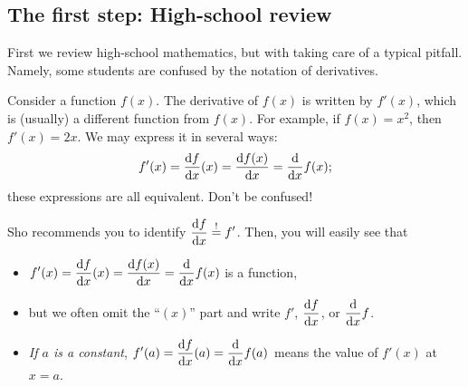\documentclass[11pt,pdfa,lastpage]{MishoNote}
\begin{document}
\begin{maketitle}
\OutputNote

\enlargethispage{-5em}

\makeatletter
{}
\makeatother

\end{maketitle}
\newpage
\subsection{The first step: High-school review}
First we review high-school mathematics, but with taking care of a typical pitfall.
Namely, some students are confused by the notation of derivatives.

Consider a function $f(x)$. The derivative of $f(x)$ is written by $f'(x)$, which is (usually) a different function from $f(x)$. For example, if $f(x)=x^2$, then $f'(x)=2x$.
We may express it in several ways:
\[ f'(x) = \diff{f}{x}(x) = \diff{f(x)}{x} = \diff{}{x}f(x); \]
these expressions are all equivalent. Don't be confused!

Sho recommends you to identify $\displaystyle \diff{f}{x} \stackrel!= f'$. Then, you will easily see that
\begin{itemize}
  \item $\displaystyle f'(x)=\diff{f}{x}(x)=\diff{f(x)}{x}=\diff{}{x}f(x)$ is a function,
  \item but we often omit the ``$(x)$'' part and write $\displaystyle f'$, $\displaystyle\diff fx$, or $\displaystyle\diff{}xf$.
  \item \emph{If $a$ is a constant}, $\displaystyle f'(a)=\diff{f}{x}(a)=\diff{}xf(a)$ means the value of $f'(x)$ at $x=a$.
\end{itemize}
\end{document}
